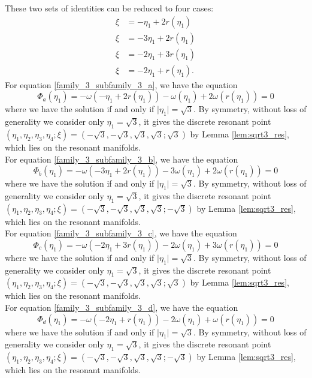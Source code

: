 \documentclass[reqno,english,11pt]{amsart}
\theoremstyle{definition}
\numberwithin{equation}{section}
\begin{document}
These two sets of identities can be reduced to four cases:
\begin{subequations}
    \begin{align}
         \xi&=-\eta_1+2r(\eta_1) \tag{a} \label{family_3_subfamily_3_a}
  \\
  \xi&=-3\eta_1+2r(\eta_1) \tag{b} \label{family_3_subfamily_3_b}
 \\
  \xi&=-2\eta_1+3r(\eta_1) \tag{c} \label{family_3_subfamily_3_c}
 \\
   \xi&= -2\eta_1+r(\eta_1). \tag{d} \label{family_3_subfamily_3_d}
    \end{align} 
\end{subequations}
For equation \eqref{family_3_subfamily_3_a}, we have the equation $$\Phi_a(\eta_1)=-\omega(-\eta_1+2r(\eta_1))-\omega(\eta_1)+2\omega(r(\eta_1))=0$$
where we have the solution if and only if $\vert \eta_1\vert=\sqrt{3}$. By symmetry, without loss of generality we consider only $\eta_1=\sqrt{3}$, it gives the discrete resonant point $(\eta_1,\eta_2,\eta_3,\eta_4;\xi)=(-\sqrt{3},-\sqrt{3},\sqrt{3},\sqrt{3};\sqrt{3})$  by Lemma \ref{lem:sqrt3_res}, which lies on the resonant manifolds.\\
\noindent
For equation \eqref{family_3_subfamily_3_b}, we have the equation $$\Phi_b(\eta_1)=-\omega(-3\eta_1+2r(\eta_1))-3\omega(\eta_1)+2\omega(r(\eta_1))=0$$
where we have the solution if and only if $\vert \eta_1\vert=\sqrt{3}$. By symmetry, without loss of generality we consider only $\eta_1=\sqrt{3}$, it gives the discrete resonant point $(\eta_1,\eta_2,\eta_3,\eta_4;\xi)=(-\sqrt{3},-\sqrt{3},\sqrt{3},\sqrt{3};-\sqrt{3})$  by Lemma \ref{lem:sqrt3_res}, which lies on the resonant manifolds.\\
\noindent
For equation \eqref{family_3_subfamily_3_c}, we have the equation $$\Phi_c(\eta_1)=-\omega(-2\eta_1+3r(\eta_1))-2\omega(\eta_1)+3\omega(r(\eta_1))=0$$
where we have the solution if and only if $\vert \eta_1\vert=\sqrt{3}$. By symmetry, without loss of generality we consider only $\eta_1=\sqrt{3}$, it gives the discrete resonant point $(\eta_1,\eta_2,\eta_3,\eta_4;\xi)=(-\sqrt{3},-\sqrt{3},\sqrt{3},\sqrt{3};\sqrt{3})$  by Lemma \ref{lem:sqrt3_res}, which lies on the resonant manifolds.\\
\noindent
For equation \eqref{family_3_subfamily_3_d}, we have the equation $$\Phi_d(\eta_1)=-\omega(-2\eta_1+r(\eta_1))-2\omega(\eta_1)+\omega(r(\eta_1))=0$$
where we have the solution if and only if $\vert \eta_1\vert=\sqrt{3}$. By symmetry, without loss of generality we consider only $\eta_1=\sqrt{3}$, it gives the discrete resonant point $(\eta_1,\eta_2,\eta_3,\eta_4;\xi)=(-\sqrt{3},-\sqrt{3},\sqrt{3},\sqrt{3};-\sqrt{3})$  by Lemma \ref{lem:sqrt3_res}, which lies on the resonant manifolds.
\end{document}
